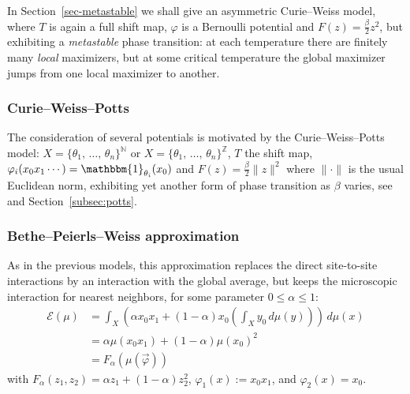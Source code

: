\documentclass[10pt]{amsart}
\theoremstyle{definition}\newtheorem{defi}[theo]{Definition}\newtheorem{rema}[theo]{Remark}\newtheorem{exam}[theo]{Example}\newtheorem{exem}[theo]{Example}\newtheorem{nota}[theo]{Notation}
\theoremstyle{plain}
\theoremstyle{plain}
\newcommand{\pot}{\varphi}
\newcounter{In}
\newcommand*\8{\infty}
\newcommand\NN{\mathbb{N}}
\newcommand\ZZ{\mathbb{Z}}
\newcommand{\En}{\mathcal{E}}
\begin{document}
In Section~\ref{sec-metastable} we shall give an asymmetric Curie--Weiss model, where $T$ is again a full shift map, $\pot$ is a Bernoulli potential and $F(z)=\frac\beta2z^2$, but exhibiting a \emph{metastable} phase transition: at each temperature there are finitely many \emph{local} maximizers, but at some critical temperature the global maximizer jumps from one local maximizer to another.

\subsubsection{Curie--Weiss--Potts}

{The consideration of several potentials is motivated by} the Curie--Weiss--Potts model: $X=\{\theta_1,\,\dots,\,\theta_n\}^{\NN}$ or $X=\{\theta_1,\,\dots,\, \theta_n\}^{\ZZ}$, $T$ the shift map, $\pot_i(x_0x_1\cdots)=\mathbbm{1}_{\theta_i}(x_0)$ and $F(z)=\frac{\beta}{2} \lVert z\rVert^2$ where $\lVert\cdot\rVert$ is the usual Euclidean norm, exhibiting yet another form of phase transition as $\beta$ varies, see~\cite{Leplaideur-Watbled-2} and Section~\ref{subsec:potts}.


\subsubsection{Bethe--Peierls--Weiss approximation}\label{subsubsec-PRW}
As in the previous models, this approximation replaces the direct site-to-site interactions by an interaction with the global average, but keeps the microscopic interaction for nearest neighbors, for some parameter $0\le\alpha\le1$:
\begin{align*}
\En(\mu) &= \int_X \left(\alpha x_0 x_1 + (1-\alpha)x_0\left(\int_X y_0\,d\mu(y)\right)\right) \, d\mu(x)\\
&=\alpha \mu(x_0x_1) + (1-\alpha) \mu(x_0)^2 \\
&= F_\alpha(\mu(\vec\pot))
\end{align*}
with $F_\alpha(z_1,z_2)=\alpha z_1 +(1-\alpha) z_2^2$, $\pot_1(x):=x_0x_1$, and $ \pot_2(x)=x_0$.
\end{document}
